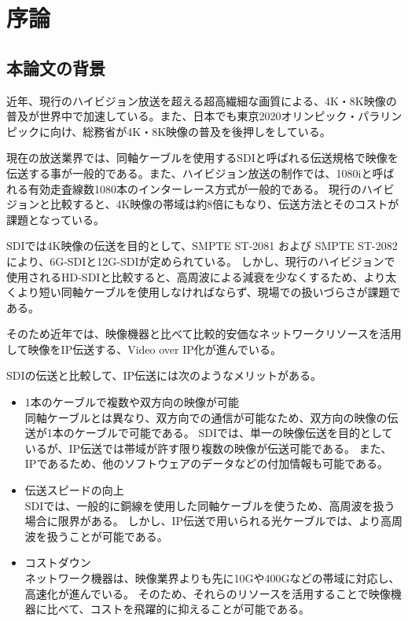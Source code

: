 \chapter{序論}
\label{chap:introduction}

\section{本論文の背景}
近年、現行のハイビジョン放送を超える超高繊細な画質による、4K・8K映像の普及が世界中で加速している。また、日本でも東京2020オリンピック・パラリンピックに向け、総務省が4K・8K映像の普及を後押しをしている。

現在の放送業界では、同軸ケーブルを使用するSDIと呼ばれる伝送規格で映像を伝送する事が一般的である。また、ハイビジョン放送の制作では、1080iと呼ばれる有効走査線数1080本のインターレース方式が一般的である。
現行のハイビジョンと比較すると、4K映像の帯域は約8倍にもなり、伝送方法とそのコストが課題となっている。

SDIでは4K映像の伝送を目的として、SMPTE ST-2081 および SMPTE ST-2082により、6G-SDIと12G-SDIが定められている。
しかし、現行のハイビジョンで使用されるHD-SDIと比較すると、高周波による減衰を少なくするため、より太くより短い同軸ケーブルを使用しなければならず、現場での扱いづらさが課題である。

そのため近年では、映像機器と比べて比較的安価なネットワークリソースを活用して映像をIP伝送する、Video over IP化が進んでいる。

SDIの伝送と比較して、IP伝送には次のようなメリットがある\cite{kodera-interbee2015}。

\begin{itemize}
  \item 1本のケーブルで複数や双方向の映像が可能\mbox{}\\
    同軸ケーブルとは異なり、双方向での通信が可能なため、双方向の映像の伝送が1本のケーブルで可能である。
    SDIでは、単一の映像伝送を目的としているが、IP伝送では帯域が許す限り複数の映像が伝送可能である。
    また、IPであるため、他のソフトウェアのデータなどの付加情報も可能である。
  \item 伝送スピードの向上\mbox{}\\
    SDIでは、一般的に銅線を使用した同軸ケーブルを使うため、高周波を扱う場合に限界がある。
    しかし、IP伝送で用いられる光ケーブルでは、より高周波を扱うことが可能である。
  \item コストダウン\mbox{}\\
    ネットワーク機器は、映像業界よりも先に10Gや400Gなどの帯域に対応し、高速化が進んでいる。
    そのため、それらのリソースを活用することで映像機器に比べて、コストを飛躍的に抑えることが可能である。
\end{itemize}

